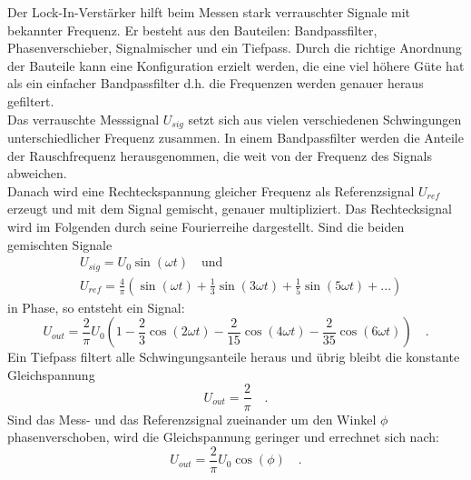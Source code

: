 Der Lock-In-Verstärker  hilft beim Messen stark verrauschter Signale mit bekannter Frequenz. Er besteht aus den Bauteilen:
 Bandpassfilter, Phasenverschieber, Signalmischer und ein Tiefpass. Durch die richtige Anordnung der Bauteile kann eine Konfiguration erzielt werden, die eine viel höhere Güte hat als ein einfacher Bandpassfilter d.h. die Frequenzen werden genauer heraus gefiltert. \\
 Das verrauschte Messsignal $U_{sig}$ setzt sich aus vielen verschiedenen Schwingungen unterschiedlicher Frequenz zusammen. In einem Bandpassfilter werden die Anteile der Rauschfrequenz herausgenommen, die weit von der Frequenz des Signals abweichen. \\
 Danach wird eine Rechteckspannung gleicher Frequenz als Referenzsignal $U_{ref}$ erzeugt und mit dem Signal gemischt, genauer multipliziert. Das Rechtecksignal wird im Folgenden durch seine Fourierreihe dargestellt. Sind die beiden gemischten Signale
 \begin{align}
 &U_{sig} = U_0  \sin(\omega t) \quad \text{und} \\
 &U_{ref} = \frac{4}{\pi} \left(\sin(\omega t ) + \frac{1}{3} \sin(3 \omega t) + \frac{1}{5} \sin{(5 \omega t)} + ... \right)
 \end{align}
 in Phase, so entsteht ein Signal:
 \begin{equation}
 U_{out} = \frac{2}{\pi}  U_0 \left( 1- \frac{2}{3} \cos{(2 \omega t)} - \frac{2}{15} \cos{(4 \omega t)} - \frac{2}{35} \cos{(6 \omega t)} \right) \quad.
 \end{equation}
Ein Tiefpass filtert alle Schwingungsanteile heraus und übrig bleibt die konstante Gleichspannung
 \begin{equation}
 U_{out} = \frac{2}{\pi} \quad .
 \end{equation}
 Sind das Mess- und das Referenzsignal zueinander  um den Winkel $\phi$ phasenverschoben, wird die Gleichspannung geringer und errechnet sich nach:
 \begin{equation}\label{Ausgangssignal}
 U_{out} = \frac{2}{\pi} U_0 \cos{(\phi)} \quad.
 \end{equation}
 	